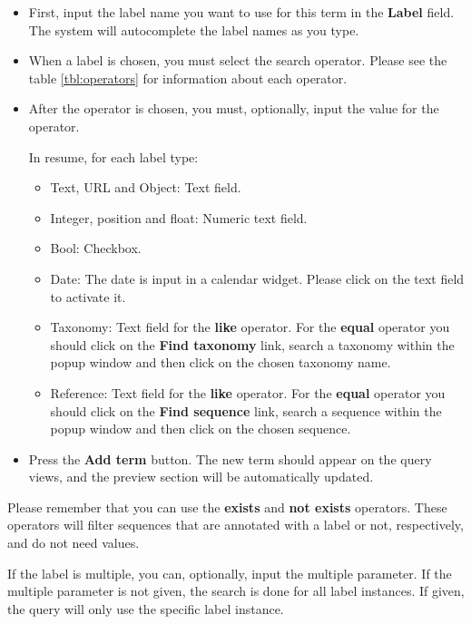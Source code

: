\begin{itemize}
  \item First, input the label name you want to use for this term in the \textbf{Label} field.
  The system will autocomplete the label names as you type.
  \item When a label is chosen, you must select the search operator. Please see the table \ref{tbl:operators}
  for information about each operator.
  \item After the operator is chosen, you must, optionally, input the value for the operator.

  In resume, for each label type:
  
  \begin{itemize}
     \item Text, URL and Object: Text field.
     \item Integer, position and float: Numeric text field.
     \item Bool: Checkbox.
     \item Date: The date is input in a calendar widget. Please click on the text field to activate it.
     \item Taxonomy: Text field for the \textbf{like} operator. For the \textbf{equal} operator you should
      click on the \textbf{Find taxonomy} link, search a taxonomy within the popup window and then click on
      the chosen taxonomy name.
     \item Reference: Text field for the \textbf{like} operator. For the \textbf{equal} operator you should
      click on the \textbf{Find sequence} link, search a sequence within the popup window and then click on
      the chosen sequence.
  \end{itemize}

  \item Press the \textbf{Add term} button. The new term should appear on the query views, and the preview
  section will be automatically updated.
\end{itemize}

Please remember that you can use the \textbf{exists} and \textbf{not exists} operators. These
operators will filter sequences that are annotated with a label or not, respectively, and do not need
values.

If the label is multiple, you can, optionally, input the multiple parameter. If the multiple parameter is
not given, the search is done for all label instances. If given, the query will only use the specific label instance.

